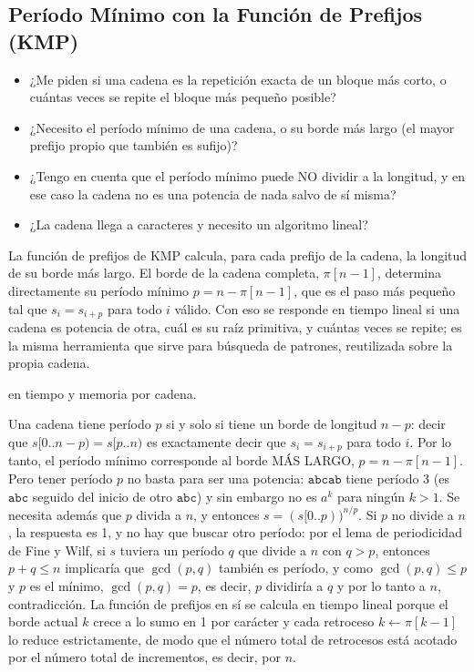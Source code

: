 \subsection{Período Mínimo con la Función de Prefijos (KMP)}
\label{alg:9-9}


\begin{itemize}
\item ¿Me piden si una cadena es la repetición exacta de un bloque más corto, o cuántas veces se repite el bloque más pequeño posible?
\item ¿Necesito el período mínimo de una cadena, o su borde más largo (el mayor prefijo propio que también es sufijo)?
\item ¿Tengo en cuenta que el período mínimo puede NO dividir a la longitud, y en ese caso la cadena no es una potencia de nada salvo de sí misma?
\item ¿La cadena llega a  caracteres y necesito un algoritmo lineal?
\end{itemize}

 La función de prefijos de KMP calcula, para cada prefijo de la cadena, la longitud de su borde más largo. El borde de la cadena completa, $\pi[n-1]$, determina directamente su período mínimo $p = n - \pi[n-1]$, que es el paso más pequeño tal que $s_i = s_{i+p}$ para todo $i$ válido. Con eso se responde en tiempo lineal si una cadena es potencia de otra, cuál es su raíz primitiva, y cuántas veces se repite; es la misma herramienta que sirve para búsqueda de patrones, reutilizada sobre la propia cadena.

  en tiempo y memoria por cadena.

 Una cadena tiene período $p$ si y solo si tiene un borde de longitud $n - p$: decir que $s[0..n-p) = s[p..n)$ es exactamente decir que $s_i = s_{i+p}$ para todo $i$. Por lo tanto, el período mínimo corresponde al borde MÁS LARGO, $p = n - \pi[n-1]$. Pero tener período $p$ no basta para ser una potencia: $\texttt{abcab}$ tiene período 3 (es $\texttt{abc}$ seguido del inicio de otro $\texttt{abc}$) y sin embargo no es $a^k$ para ningún $k > 1$. Se necesita además que $p$ divida a $n$, y entonces $s = (s[0..p))^{n/p}$. Si $p$ no divide a $n$, la respuesta es 1, y no hay que buscar otro período: por el lema de periodicidad de Fine y Wilf, si $s$ tuviera un período $q$ que divide a $n$ con $q > p$, entonces $p + q \le n$ implicaría que $\gcd(p, q)$ también es período, y como $\gcd(p,q) \le p$ y $p$ es el mínimo, $\gcd(p,q) = p$, es decir, $p$ dividiría a $q$ y por lo tanto a $n$, contradicción. La función de prefijos en sí se calcula en tiempo lineal porque el borde actual $k$ crece a lo sumo en 1 por carácter y cada retroceso $k \leftarrow \pi[k-1]$ lo reduce estrictamente, de modo que el número total de retrocesos está acotado por el número total de incrementos, es decir, por $n$.~\cite{knuth1977}

